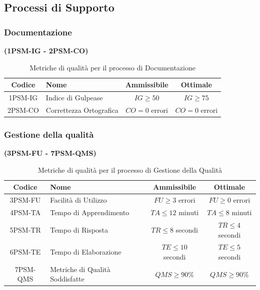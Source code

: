 \documentclass{article}
\begin{document}
\subsection{Processi di Supporto}
\subsubsection{Documentazione}%
\textbf{(1PSM-IG - 2PSM-CO)}

\begin{table}[H]
    \centering
    \renewcommand{\arraystretch}{1.5} %
    \begin{tabular}{|c|l|c|c|}
        \hline
        \textbf{Codice} & \textbf{Nome} & \textbf{Ammissibile} & \textbf{Ottimale} \\
        \hline
        1PSM-IG & Indice di Gulpease & $IG \geq 50$ & $IG \geq 75$ \\
        2PSM-CO & Correttezza Ortografica & $CO = 0$ errori & $CO = 0$ errori \\ 
        \hline
    \end{tabular}
    \label{tab:documentazione}
    \caption{Metriche di qualità per il processo di Documentazione}
\end{table}

\subsubsection{Gestione della qualità}%
\textbf{(3PSM-FU - 7PSM-QMS)}
\begin{table}[H]
    \centering
    \renewcommand{\arraystretch}{1.5} %
    \begin{tabular}{|c|l|c|c|}
        \hline
        \textbf{Codice} & \textbf{Nome} & \textbf{Ammissibile} & \textbf{Ottimale} \\
        \hline
        3PSM-FU & Facilità di Utilizzo & $FU \geq 3$ errori & $FU \geq 0$ errori \\
        4PSM-TA & Tempo di Apprendimento & $TA \leq 12$ minuti & $TA \leq 8$ minuti \\
        5PSM-TR & Tempo di Risposta & $TR \leq 8$ secondi & $TR \leq 4$ secondi \\
        6PSM-TE & Tempo di Elaborazione & $TE \leq 10$ secondi & $TE \leq 5$ secondi \\
        7PSM-QMS & Metriche di Qualità Soddisfatte & $QMS \geq 90\%$ & $QMS \geq 90\%$\\
        \hline
    \end{tabular}
    \label{tab:gestione_qualità}
    \caption{Metriche di qualità per il processo di Gestione della Qualità}
\end{table}
\end{document}
